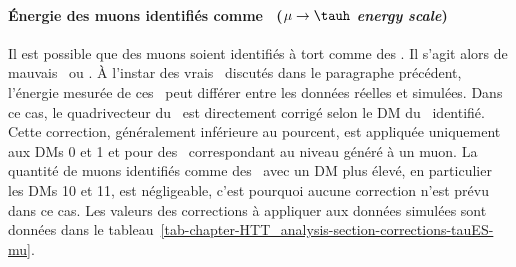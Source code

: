\paragraph{Énergie des muons identifiés comme \tauh\ (\emph{$\mu\to\tauh$ energy scale})}
Il est possible que des muons soient identifiés à tort comme des \tauh.
Il s'agit alors de mauvais \tauh\ ou \og \ftauhs \fg{}.
À l'instar des vrais \tauh\ discutés dans le paragraphe précédent, l'énergie mesurée de ces \ftauhs\ peut différer entre les données réelles et simulées.
Dans ce cas, le quadrivecteur du \ftauh\ est directement corrigé selon le DM du \tauh\ identifié.
Cette correction, généralement inférieure au pourcent, est appliquée uniquement aux DMs 0 et 1 et pour des \tauh\ correspondant au niveau généré à un muon.
La quantité de muons identifiés comme des \tauh\ avec un DM plus élevé, en particulier les DMs 10 et 11, est négligeable, c'est pourquoi aucune correction n'est prévu dans ce cas.
Les valeurs des corrections à appliquer aux données simulées sont données dans le tableau~\ref{tab-chapter-HTT_analysis-section-corrections-tauES-mu}.
